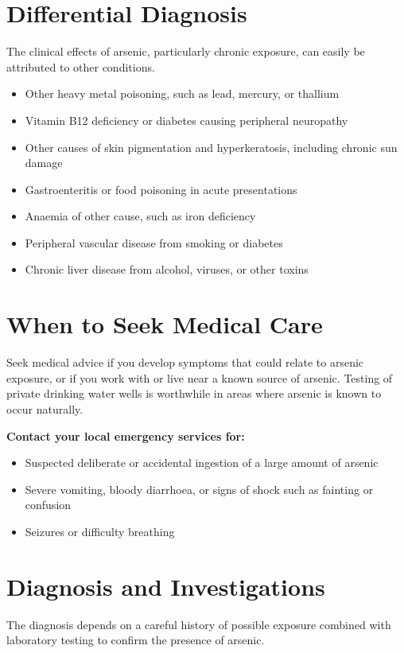 \section*{Differential Diagnosis}
The clinical effects of arsenic, particularly chronic exposure, can easily be attributed to other conditions.

\begin{itemize}
    \item Other heavy metal poisoning, such as lead, mercury, or thallium
    \item Vitamin B12 deficiency or diabetes causing peripheral neuropathy
    \item Other causes of skin pigmentation and hyperkeratosis, including chronic sun damage
    \item Gastroenteritis or food poisoning in acute presentations
    \item Anaemia of other cause, such as iron deficiency
    \item Peripheral vascular disease from smoking or diabetes
    \item Chronic liver disease from alcohol, viruses, or other toxins
\end{itemize}

\section*{When to Seek Medical Care}
Seek medical advice if you develop symptoms that could relate to arsenic exposure, or if you work with or live near a known source of arsenic. Testing of private drinking water wells is worthwhile in areas where arsenic is known to occur naturally.

\textbf{Contact your local emergency services for:}
\begin{itemize}
    \item Suspected deliberate or accidental ingestion of a large amount of arsenic
    \item Severe vomiting, bloody diarrhoea, or signs of shock such as fainting or confusion
    \item Seizures or difficulty breathing
\end{itemize}

\section*{Diagnosis and Investigations}
The diagnosis depends on a careful history of possible exposure combined with laboratory testing to confirm the presence of arsenic.

